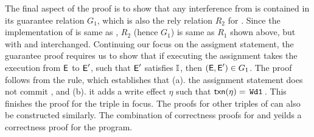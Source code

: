 The final aspect of the proof is to show that any interference from
 is contained in its guarantee relation $G_1$, which is also
the rely relation $R_2$ for . Since the implementation of
 is same as , $R_2$ (hence $G_1$) is same as $R_1$ shown
above, but with  and  interchanged. Continuing our focus
on the assigment statement, the guarantee proof requires us to show
that if executing the assignment takes the execution from $\textsf{E}$ to
$\textsf{E}'$, such that $\textsf{E}'$ satisfies $\mathbb{I}$, then $(\textsf{E},\textsf{E}') \in G_1$.  The
proof follows from the  rule, which establishes
that (a). the assignment statement does not commit , and (b).
it adds a write effect $\eta$ such that $\textsf{txn}(\eta)=\,{\tt Wd1}\,$. This
finishes the proof for the triple in focus. The proofs for other
triples of  can also be constructed similarly. The combination
of correctness proofs for  and  yeilds a correctness
proof for the program.

